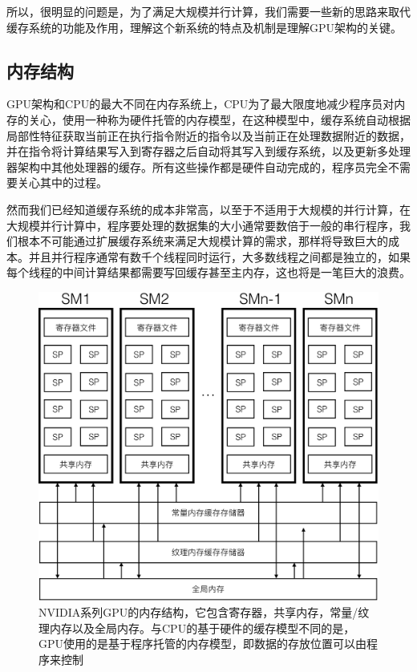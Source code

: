 所以，很明显的问题是，为了满足大规模并行计算，我们需要一些新的思路来取代缓存系统的功能及作用，理解这个新系统的特点及机制是理解GPU架构的关键。




\subsection{内存结构}
GPU架构和CPU的最大不同在内存系统上，CPU为了最大限度地减少程序员对内存的关心，使用一种称为硬件托管的内存模型，在这种模型中，缓存系统自动根据局部性特征获取当前正在执行指令附近的指令以及当前正在处理数据附近的数据，并在指令将计算结果写入到寄存器之后自动将其写入到缓存系统，以及更新多处理器架构中其他处理器的缓存。所有这些操作都是硬件自动完成的，程序员完全不需要关心其中的过程。

然而我们已经知道缓存系统的成本非常高，以至于不适用于大规模的并行计算，在大规模并行计算中，程序要处理的数据集的大小通常要数倍于一般的串行程序，我们根本不可能通过扩展缓存系统来满足大规模计算的需求，那样将导致巨大的成本。并且并行程序通常有数千个线程同时运行，大多数线程之间都是独立的，如果每个线程的中间计算结果都需要写回缓存甚至主内存，这也将是一笔巨大的浪费。

\begin{figure}
	\includegraphics[width=1.0\textwidth]{figures/rp/sm}
	\caption{NVIDIA系列GPU的内存结构，它包含寄存器，共享内存，常量/纹理内存以及全局内存。与CPU的基于硬件的缓存模型不同的是，GPU使用的是基于程序托管的内存模型，即数据的存放位置可以由程序来控制}
	\label{f:rp-sm}
\end{figure}

